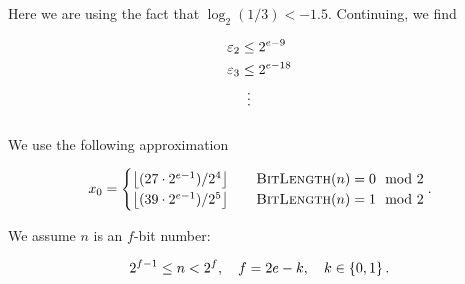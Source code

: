 \noindent
Here we are using the fact that $\log_{2}(1/3) < -1.5$.
Continuing, we find

\begin{align}
    \varepsilon_{2} &\le 2^{e-9} \nonumber\\
    \varepsilon_{3} &\le 2^{e-18} \nonumber\\
        &\ \vdots
\end{align}


\subsubsection{\BitLength{}}
\label{app:error_bounds:bitlength}

We use the following approximation

\begin{equation}
    x_{0} = \begin{cases}
        \left\lfloor (27\cdot2^{e-1})/2^{4} \right\rfloor &\quad
            \textsc{BitLength}(n) = 0 \mod 2 \\
        \left\lfloor (39\cdot2^{e-1})/2^{5} \right\rfloor &\quad
            \textsc{BitLength}(n) = 1 \mod 2 \\
    \end{cases}.
\end{equation}

\noindent
We assume $n$ is an $f$-bit number:

\begin{equation}
    2^{f-1} \le n < 2^{f}, \quad f = 2e-k, \quad k\in\left\{ 0,1 \right\}.
\end{equation}

